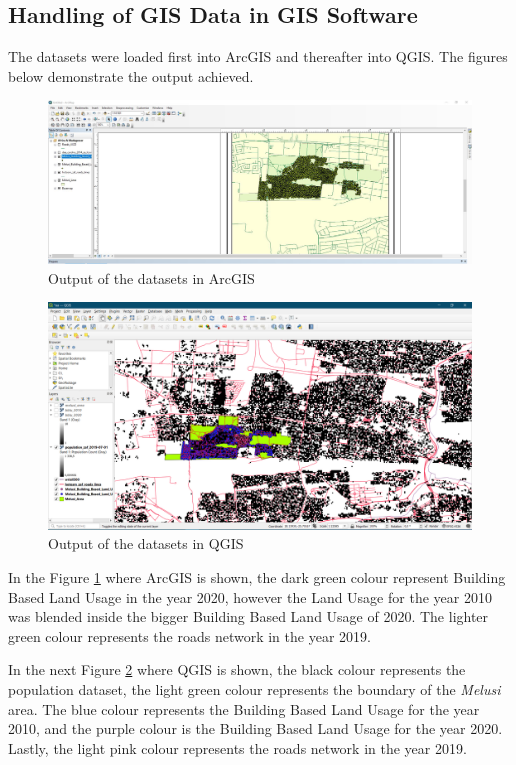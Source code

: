 \subsection{Handling of GIS Data in GIS Software}
The datasets were loaded first into ArcGIS and thereafter into QGIS. The figures below demonstrate the output achieved.
\begin{figure}[H]
\centering
\includegraphics[scale=0.3]{Figures/Chapter3/ArcGIS}
\caption{Output of the datasets in ArcGIS}
\label{fig:Arc}
\end{figure}
\begin{figure}[H]
\centering
\includegraphics[scale=0.35]{Figures/Chapter3/QGIS}
\caption{Output of the datasets in QGIS}
\label{fig:Q}
\end{figure}
In the Figure \ref{fig:Arc} where ArcGIS is shown, the dark green colour represent Building Based Land Usage in the year 2020, however the Land Usage for the year 2010 was blended inside the bigger Building Based Land Usage of 2020. The lighter green colour represents the roads network in the year 2019.

In the next Figure \ref{fig:Q} where QGIS is shown, the black colour represents the population dataset, the light green colour represents the boundary of the \textit{Melusi} area. The blue colour represents the Building Based Land Usage for the year 2010, and the purple colour is the Building Based Land Usage for the year 2020. Lastly, the light pink colour represents the roads network in the year 2019.


